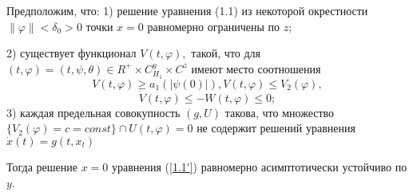 		\begin{theorem}\label{t-1.12} Предположим, что: 
			1) решение уравнения (1.1) из некоторой окрестности ${\| \varphi \| < \delta_0 > 0}$ точки $x = 0$ равномерно ограничены по $z;$
			
			2) существует функционал $V(t, \varphi), $ такой, что для $(t, \varphi) = (t, \psi, \theta) \in R^+ \times C^y_{H_1} \times C^z$ имеют место соотношения
			$$V(t, \varphi) \ge a_1(| \psi(0) |), V(t, \varphi) \le V_2(\varphi),$$
			$$ \dot V(t, \varphi) \le - W(t, \varphi) \le 0;$$
			3) каждая предельная совокупность $(g, U)$ такова, что множество $ \lbrace V_2(\varphi) = c = const \rbrace \cap {U(t, \varphi) = 0}$ не содержит решений уравнения $\dot x(t) = g(t, x_t)$
			
			Тогда решение $x = 0$ уравнения (\ref{1.1'}) равномерно асимптотически устойчиво по $y$.			
			
		\end{theorem}

